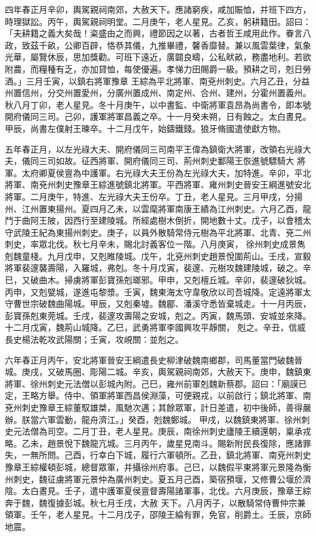 \begin{pinyinscope}
 四年春正月辛卯，輿駕親祠南郊，大赦天下。應諸窮疾，咸加賑恤，并班下四方，時理獄訟。丙午，輿駕親祠明堂。二月庚午，老人星見。乙亥，躬耕籍田。詔曰：「夫耕籍之義大矣哉！粢盛由之而興，禮節因之以著，古者哲王咸用此作。眷言八政，致茲千畝，公卿百辟，恪恭其儀，九推畢禮，馨香靡替。兼以風雲葉律，氣象光華，屬覽休辰，思加獎勸。可班下遠近，廣闢良疇，公私畎畝，務盡地利。若欲附農，而糧種有乏，亦加貸恤，每使優遍。孝悌力田賜爵一級。預耕之司，剋日勞酒。」三月壬寅，以鎮右將軍豫章
 王綜為平北將軍、南兗州刺史。六月乙丑，分益州置信州，分交州置愛州，分廣州置成州、南定州、合州、建州，分霍州置義州。秋八月丁卯，老人星見。冬十月庚午，以中書監、中衛將軍袁昂為尚書令，即本號開府儀同三司。己卯，護軍將軍昌義之卒。十一月癸未朔，日有蝕之。太白晝見。甲辰，尚書左僕射王暕卒。十二月戊午，始鑄鐵錢。狼牙脩國遣使獻方物。



 五年春正月，以左光祿大夫、開府儀同三司南平王偉為鎮衛大將軍，改領右光祿大夫，儀同三司如故。征西將軍、開府儀同三司、荊州刺史鄱陽王恢進號驃騎大
 將軍。太府卿夏侯亶為中護軍。右光祿大夫王份為左光祿大夫，加特進。辛卯，平北將軍、南兗州刺史豫章王綜進號鎮北將軍。平西將軍、雍州刺史晉安王綱進號安北將軍。二月庚午，特進、左光祿大夫王份卒。丁丑，老人星見。三月甲戌，分揚州、江州置東揚州。夏四月乙未，以雲麾將軍南康王績為江州刺史。六月乙酉，龍鬥于曲阿王陂，因西行至建陵城。所經處樹木倒折，開地數十丈。戊子，以會稽太守武陵王紀為東揚州刺史。庚子，以員外散騎常侍元樹為平北將軍、北青、兗二州刺史，率眾北伐。秋七月辛未，賜北討義客位一階。八月庚寅，
 徐州刺史成景雋剋魏童棧。九月戊申，又剋睢陵城。戊午，北兗州刺史趙景悅圍荊山。壬戌，宣毅將軍裴邃襲壽陽，入羅城，弗剋。冬十月戊寅，裴邃、元樹攻魏建陵城，破之。辛巳，又破曲木。掃虜將軍彭寶孫剋瑯邪。甲申，又剋檀丘城。辛卯，裴邃破狄城。丙申，又剋甓城，遂進屯黎漿。壬寅，魏東海太守韋敬欣以司吾城降。定遠將軍太守曹世宗破魏曲陽城。甲辰，又剋秦墟。魏郿、潘溪守悉皆棄城走。十一月丙辰，彭寶孫剋東莞城。壬戌，裴邃攻壽陽之安城，剋之。丙寅，魏馬頭、安城並來降。十二月戊寅，魏荊山城降。乙巳，武勇將軍李國興攻平靜關，
 剋之。辛丑，信威長史楊法乾攻武陽關；壬寅，攻峴關：並剋之。



 六年春正月丙午，安北將軍晉安王綱遣長史柳津破魏南鄉郡，司馬董當門破魏晉城。庚戌，又破馬圈、彫陽二城。辛亥，輿駕親祠南郊，大赦天下。庚申，魏鎮東將軍、徐州刺史元法僧以彭城內附。己巳，雍州前軍剋魏新蔡郡。詔曰：「廟謨已定，王略方舉。侍中、領軍將軍西昌侯淵藻，可便親戎，以前啟行；鎮北將軍、南兗州刺史豫章王綜董馭雄桀，風馳次邁；其餘眾軍，計日差遣，初中後師，善得嚴辦。朕當六軍雲動，龍舟濟江。」癸酉，剋魏鄭城。
 甲戌，以魏鎮東將軍、徐州刺史元法僧為司空。二月丁丑，老人星見。庚辰，南徐州刺史廬陵王續還朝，稟承戎略。乙未，趙景悅下魏龍亢城。三月丙午，歲星見南斗。賜新附民長復除，應諸罪失，一無所問。己酉，行幸白下城，履行六軍頓所。乙丑，鎮北將軍、南兗州刺史豫章王綜權頓彭城，總督眾軍，并攝徐州府事。己巳，以魏假平東將軍元景隆為衡州刺史，魏征虜將軍元景仲為廣州刺史。夏五月己酉，築宿預堰，又修曹公堰於濟陰。太白晝見。壬子，遣中護軍夏侯亶督壽陽諸軍事，北伐。六月庚辰，豫章王綜奔于魏，魏復據彭城。秋七月壬戌，大赦
 天下。八月丙子，以散騎常侍曹仲宗兼領軍。壬午，老人星見。十二月戊子，邵陵王綸有罪，免官，削爵土。壬辰，京師地震。




\end{pinyinscope}
